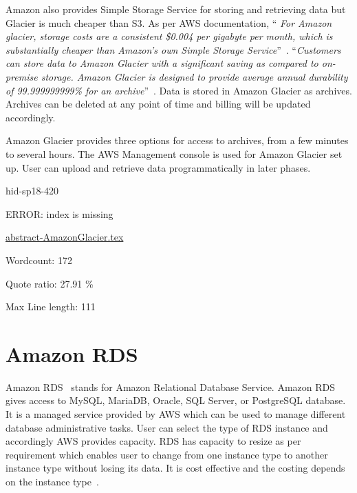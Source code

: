 Amazon also provides Simple Storage Service for storing and retrieving data but
Glacier is much cheaper than S3. As per AWS documentation, \color{blue}``\emph{ For Amazon glacier,
storage costs are a consistent \$0.004 per gigabyte per month, which is
substantially cheaper than Amazon's own Simple Storage
Service}''\color{black}~\cite{hid-sp18-420-Amazon-Glacier-FAQ}. \color{blue}``\emph{Customers can store data to
Amazon Glacier with a significant saving as compared to on-premise storage.
Amazon Glacier is designed to provide average annual durability of
99.999999999\% for an archive}''\color{black}~\cite{hid-sp18-420-Amazon-Glacier}. Data is
stored in Amazon Glacier as archives. Archives can be deleted at any point of
time and billing will be updated accordingly.

Amazon Glacier provides three options for access to archives, from a few minutes
to several hours. The AWS Management console is used for Amazon Glacier set up.
User can upload and retrieve data programmatically in later phases.


\begin{IU}

hid-sp18-420

ERROR: index is missing

\href{https://github.com/cloudmesh-community/hid-sp18-420/blob/master//technology/abstract-AmazonGlacier.tex}{abstract-AmazonGlacier.tex}

 

Wordcount: 172


Quote ratio: 27.91 \%
 
Max Line length: 111
\end{IU}

\section{Amazon RDS}

Amazon RDS~\cite{hid-sp18-420-amazon-RDS} stands for Amazon Relational Database
Service. Amazon RDS gives access to MySQL, MariaDB, Oracle, SQL Server, or
PostgreSQL database. It is a managed service provided by AWS which can be used
to manage different database administrative tasks. User can select the type of
RDS instance and accordingly AWS provides capacity. RDS has capacity to resize
as per requirement which enables user to change from one instance type to
another instance type without losing its data. It is cost effective and the
costing depends on the instance type~\cite{hid-sp18-420-amazon-RDS-FAQ}.

